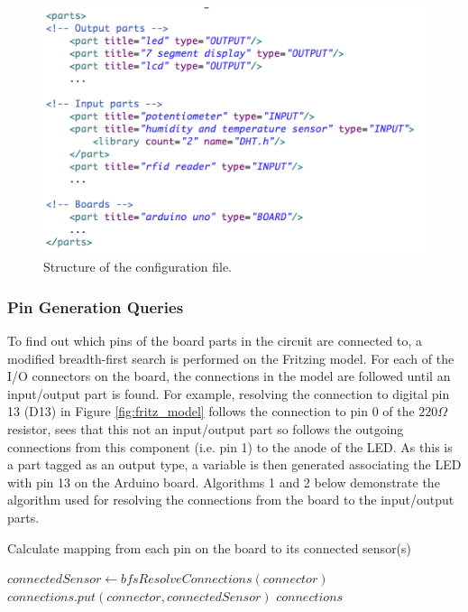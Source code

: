 \documentclass{UoYCSproject}
\begin{document}
\begin{figure}[h!]
  \centering
  \includegraphics[width=0.6\linewidth]{graphics/config_file.png}
  \caption{Structure of the configuration file.}
  \label{fig:config}
\end{figure}

\subsubsection{Pin Generation Queries}
To find out which pins of the board parts in the circuit are connected to, a modified breadth-first search is performed on the Fritzing model. For each of the I/O connectors on the board, the connections in the model are followed until an input/output part is found. For example, resolving the connection to digital pin 13 (D13) in Figure \ref{fig:fritz_model} follows the connection to pin $0$ of the $220\Omega$ resistor, sees that this not an input/output part so follows the outgoing connections from this component (i.e. pin 1) to the anode of the LED. As this is a part tagged as an output type, a variable is then generated associating the LED with pin 13 on the Arduino board. Algorithms 1 and 2 below demonstrate the algorithm used for resolving the connections from the board to the input/output parts.

\begin{algorithm}
\caption{Calculate mapping from each pin on the board to its connected sensor(s)}
\begin{algorithmic}[1]
\State $connectedSensor \leftarrow bfsResolveConnections(connector)$
\State $connections.put(connector, connectedSensor)$
\EndFor
\Return $connections$
\\
\EndProcedure
\end{algorithmic}
\end{algorithm}
\end{document}
